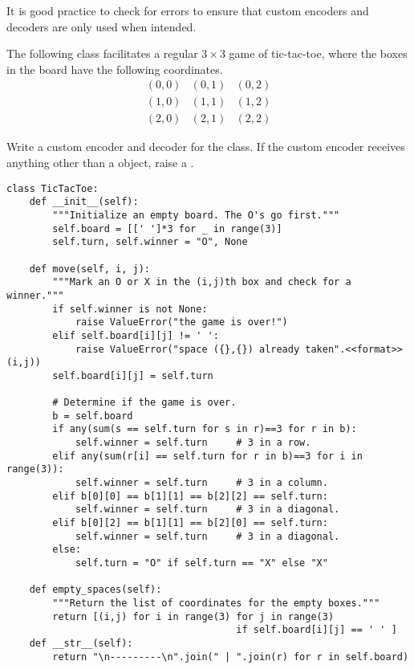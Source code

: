 It is good practice to check for errors to ensure that custom encoders and decoders are only used when intended.

\begin{problem}
The following class facilitates a regular $3\times 3$ game of tic-tac-toe, where the boxes in the board have the following coordinates.
\[
\begin{array}{c|c|c}
(0,0) & (0,1) & (0,2) \\ \hline
(1,0) & (1,1) & (1,2) \\ \hline
(2,0) & (2,1) & (2,2)
\end{array}
\]

Write a custom encoder and decoder for the  class.
If the custom encoder receives anything other than a  object, raise a .

\begin{lstlisting}
class TicTacToe:
    def __init__(self):
        """Initialize an empty board. The O's go first."""
        self.board = [[' ']*3 for _ in range(3)]
        self.turn, self.winner = "O", None

    def move(self, i, j):
        """Mark an O or X in the (i,j)th box and check for a winner."""
        if self.winner is not None:
            raise ValueError("the game is over!")
        elif self.board[i][j] != ' ':
            raise ValueError("space ({},{}) already taken".<<format>>(i,j))
        self.board[i][j] = self.turn

        # Determine if the game is over.
        b = self.board
        if any(sum(s == self.turn for s in r)==3 for r in b):
            self.winner = self.turn     # 3 in a row.
        elif any(sum(r[i] == self.turn for r in b)==3 for i in range(3)):
            self.winner = self.turn     # 3 in a column.
        elif b[0][0] == b[1][1] == b[2][2] == self.turn:
            self.winner = self.turn     # 3 in a diagonal.
        elif b[0][2] == b[1][1] == b[2][0] == self.turn:
            self.winner = self.turn     # 3 in a diagonal.
        else:
            self.turn = "O" if self.turn == "X" else "X"

    def empty_spaces(self):
        """Return the list of coordinates for the empty boxes."""
        return [(i,j) for i in range(3) for j in range(3)
                                        if self.board[i][j] == ' ' ]
    def __str__(self):
        return "\n---------\n".join(" | ".join(r) for r in self.board)
\end{lstlisting}

\label{prob:tictactoe-serialization}
\end{problem}



